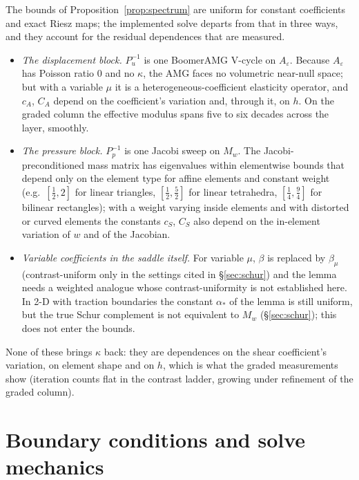 \documentclass[11pt]{article}
\numberwithin{equation}{section}
\theoremstyle{remark}
\newcommand{\eps}{\varepsilon}
\newcommand{\Ae}{A_{\eps}}
\newcommand{\Mw}{M_{w}}
\begin{document}
The bounds of Proposition~\ref{prop:spectrum} are uniform for constant
coefficients and exact Riesz maps; the implemented solve departs from that
in three ways, and they account for the residual dependences that are
measured.
\begin{itemize}
\item \emph{The displacement block.} $P_u^{-1}$ is one BoomerAMG V-cycle
  on $\Ae$. Because $\Ae$ has Poisson ratio $0$ and no $\kappa$, the AMG
  faces no volumetric near-null space; but with a variable $\mu$ it is a
  heterogeneous-coefficient elasticity operator, and $c_A$, $C_A$ depend
  on the coefficient's variation and, through it, on $h$. On the graded
  column the effective modulus spans five to six decades across the
  layer, smoothly.
\item \emph{The pressure block.} $P_p^{-1}$ is one Jacobi sweep on $\Mw$.
  The Jacobi-preconditioned mass matrix has eigenvalues within elementwise
  bounds that depend only on the element type for affine elements and
  constant weight \cite{Wathen1987} (e.g.\ $[\frac12,2]$ for linear
  triangles, $[\frac12,\frac52]$ for linear tetrahedra, $[\frac14,\frac94]$
  for bilinear rectangles); with a weight varying inside elements and with
  distorted or curved elements the constants $c_S$, $C_S$ also depend on
  the in-element variation of $w$ and of the Jacobian.
\item \emph{Variable coefficients in the saddle itself.} For variable
  $\mu$, $\beta$ is replaced by $\beta_\mu$ (contrast-uniform only in the
  settings cited in \S\ref{sec:schur}) and the lemma needs a weighted
  analogue whose contrast-uniformity is not established here. In 2-D with
  traction boundaries the constant $\alpha_*$ of the lemma is still
  uniform, but the true Schur complement is not equivalent to $\Mw$
  (\S\ref{sec:schur}); this does not enter the bounds.
\end{itemize}
None of these brings $\kappa$ back: they are dependences on the shear
coefficient's variation, on element shape and on $h$, which is what the
graded measurements show (iteration counts flat in the contrast ladder,
growing under refinement of the graded column).

\section{Boundary conditions and solve mechanics}
\label{sec:mechanics}
\end{document}
